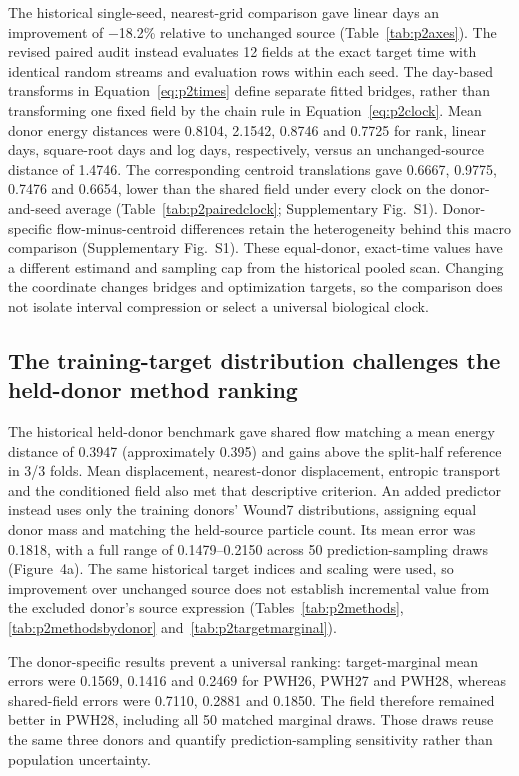 \documentclass[10pt,a4paper]{article}
\begin{document}
The historical single-seed, nearest-grid comparison gave linear days an improvement of −18.2\% relative to unchanged source (Table~\ref{tab:p2axes}). The revised paired audit instead evaluates 12 fields at the exact target time with identical random streams and evaluation rows within each seed. The day-based transforms in Equation~\eqref{eq:p2times} define separate fitted bridges, rather than transforming one fixed field by the chain rule in Equation~\eqref{eq:p2clock}. Mean donor energy distances were 0.8104, 2.1542, 0.8746 and 0.7725 for rank, linear days, square-root days and log days, respectively, versus an unchanged-source distance of 1.4746. The corresponding centroid translations gave 0.6667, 0.9775, 0.7476 and 0.6654, lower than the shared field under every clock on the donor-and-seed average (Table~\ref{tab:p2pairedclock}; Supplementary Fig.~S1\label{call:p2f4}). Donor-specific flow-minus-centroid differences retain the heterogeneity behind this macro comparison (Supplementary Fig.~S1). These equal-donor, exact-time values have a different estimand and sampling cap from the historical pooled scan. Changing the coordinate changes bridges and optimization targets, so the comparison does not isolate interval compression or select a universal biological clock.






\subsection{The training-target distribution challenges the held-donor method ranking}

The historical held-donor benchmark gave shared flow matching a mean energy distance of 0.3947 (approximately 0.395) and gains above the split-half reference in 3/3 folds. Mean displacement, nearest-donor displacement, entropic transport and the conditioned field also met that descriptive criterion. An added predictor instead uses only the training donors' Wound7 distributions, assigning equal donor mass and matching the held-source particle count. Its mean error was 0.1818, with a full range of 0.1479--0.2150 across 50 prediction-sampling draws (Figure~4a\label{call:p2f5}). The same historical target indices and scaling were used, so improvement over unchanged source does not establish incremental value from the excluded donor's source expression (Tables~\ref{tab:p2methods}, \ref{tab:p2methodsbydonor} and~\ref{tab:p2targetmarginal}).

The donor-specific results prevent a universal ranking: target-marginal mean errors were 0.1569, 0.1416 and 0.2469 for PWH26, PWH27 and PWH28, whereas shared-field errors were 0.7110, 0.2881 and 0.1850. The field therefore remained better in PWH28, including all 50 matched marginal draws. Those draws reuse the same three donors and quantify prediction-sampling sensitivity rather than population uncertainty.
\end{document}
